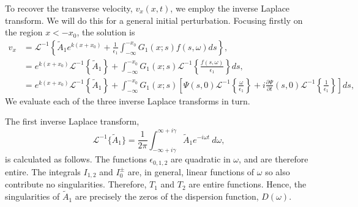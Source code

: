 \documentclass[12pt]{../style-files/ociamthesis}
\begin{document}
To recover the transverse velocity, $v_x(x, t)$, we employ the inverse Laplace transform. We will do this for a general initial perturbation. Focusing firstly on the region $x < -x_0$, the solution is
\newcommand{\e}{\epsilon}
\begin{align}
v_x &= \mathcal{L}^{-1} \left\{ \tilde{A}_1 e^{k(x+x_0)} + \frac{1}{\e_1} \int_{-\infty}^{-x_0} G_1(x;s)f(s, \omega)ds \right\}, \\
&= e^{k(x+x_0)} \mathcal{L}^{-1}\left\{ \tilde{A}_1 \right\} + \int_{-\infty}^{-x_0} G_1(x;s) \mathcal{L}^{-1}\left\{ \frac{f(s, \omega)}{\e_1} \right\} ds, \\
&= e^{k(x+x_0)} \mathcal{L}^{-1}\left\{ \tilde{A}_1 \right\} + \int_{-\infty}^{-x_0} G_1(x;s) \left[ \Psi (s, 0) \mathcal{L}^{-1}\left\{ \frac{\omega}{\e_1} \right\} + i \frac{\partial \Psi}{\partial t}(s, 0) \mathcal{L}^{-1}\left\{ \frac{1}{\e_1} \right\}\right] ds,
\label{sol incomp}
\end{align}
We evaluate each of the three inverse Laplace transforms in turn.

The first inverse Laplace transform,
\begin{equation}
\mathcal{L}^{-1} \{\tilde{A}_1\} = \frac{1}{2\pi} \int_{-\infty + i\gamma}^{\infty + i\gamma} \tilde{A}_1 e^{-i\omega t} ~d\omega,
\end{equation}
is calculated as follows. The functions $\epsilon_{0,1,2}$ are quadratic in $\omega$, and are therefore entire. The integrals $I_{1,2}$ and $I_0^\pm$ are, in general, linear functions of $\omega$ so also contribute no singularities. Therefore, $T_1$ and $T_2$ are entire functions. Hence, the singularities of $\tilde{A}_1$ are precisely the zeros of the dispersion function, $D(\omega)$.
\end{document}
